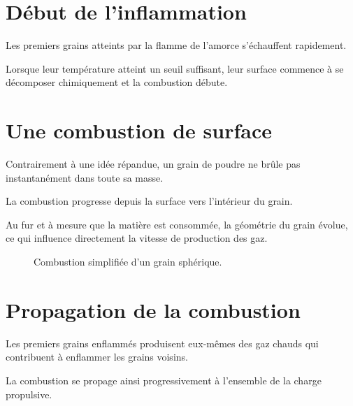 \section{Début de l'inflammation}

Les premiers grains atteints par la flamme de l'amorce s'échauffent rapidement.

Lorsque leur température atteint un seuil suffisant, leur surface commence à se
décomposer chimiquement et la combustion débute.

\section{Une combustion de surface}

Contrairement à une idée répandue, un grain de poudre ne brûle pas
instantanément dans toute sa masse.

La combustion progresse depuis la surface vers l'intérieur du grain.

Au fur et à mesure que la matière est consommée, la géométrie du grain évolue,
ce qui influence directement la vitesse de production des gaz.

\begin{figure}[htbp]
\centering


\caption{Combustion simplifiée d'un grain sphérique.}
\label{fig:combustion_grain}

\end{figure}

\section{Propagation de la combustion}

Les premiers grains enflammés produisent eux-mêmes des gaz chauds qui
contribuent à enflammer les grains voisins.

La combustion se propage ainsi progressivement à l'ensemble de la charge
propulsive.

